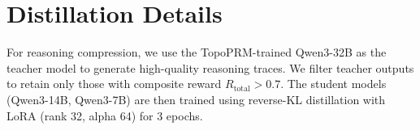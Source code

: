 \section{Distillation Details}
\label{app:distill}

For reasoning compression, we use the TopoPRM-trained Qwen3-32B as the
teacher model to generate high-quality reasoning traces. We filter
teacher outputs to retain only those with composite reward
$R_\mathrm{total} > 0.7$. The student models (Qwen3-14B, Qwen3-7B) are
then trained using reverse-KL distillation with LoRA (rank 32, alpha 64)
for 3 epochs.
